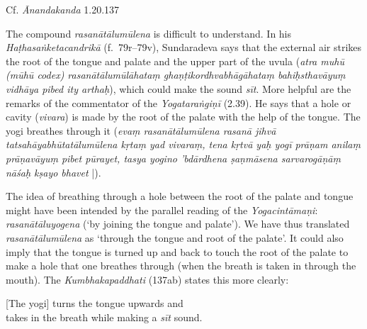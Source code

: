 \begin{ekdosis}
\begin{testimonia}[hp02_057]
Cf. \emph{Ānandakanda} 1.20.137

\begin{versinnote}
\end{versinnote}
\end{testimonia}

\begin{philcomm}[hp02_057]

The compound \emph{rasanātālumūlena} is difficult to understand. In his \emph{Haṭhasaṅketacandrikā} (f.~79r–79v), Sundaradeva says that the external air strikes the root of the tongue and palate and the upper part of the uvula (\emph{atra muhū (mūhū codex) rasanātālumūlāhataṃ ghaṇṭikordhvabhāgāhataṃ bahiḥsthavāyuṃ vidhāya pibed ity arthaḥ}), which could make the sound \emph{sīt}. More helpful are the remarks of the commentator of the \emph{Yogataraṅgiṇī} (2.39). He says that a hole or cavity (\emph{vivara}) is made by the root of the palate with the help of the tongue. The yogi breathes through it (\emph{evaṃ rasanātālumūlena rasanā jihvā tatsahāyabhūtatālumūlena kṛtaṃ yad vivaraṃ, tena kṛtvā yaḥ yogī prāṇam anilaṃ prāṇavāyuṃ pibet pūrayet, tasya yogino ’bdārdhena ṣaṇmāsena sarvarogāṇāṃ nāśaḥ kṣayo bhavet} |).\lb

The idea of breathing through a hole between the root of the palate and tongue might have been intended by the parallel reading of the \emph{Yogacintāmaṇi}: \emph{rasanā\-tālu\-yogena} (‘by joining the tongue and palate'). We have thus translated \emph{rasanā\-tālu\-mūlena} as ‘through the tongue and root of the palate’. It could also imply that the tongue is turned up and back to touch the root of the palate to make a hole that one breathes through (when the breath is taken in through the mouth). The \emph{Kumbhaka\-paddhati} (137ab) states this more clearly:

\begin{versinnote}
{[}The yogi] turns the tongue upwards and \\
takes in the breath while making a \emph{sīt} sound.

\end{versinnote}


\end{philcomm}
\end{ekdosis}
